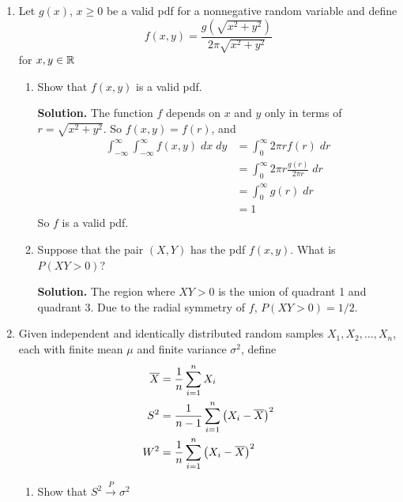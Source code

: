 \documentclass[titlepage]{article}
\begin{document}
\begin{enumerate}
\item Let $g(x)$, $x \geq 0$ be a valid pdf for a nonnegative random variable and define
\[ f(x, y) = \frac{ g(\sqrt{x^2 + y^2}) }{ 2\pi \sqrt{x^2 + y^2} }\]
for $x, y \in \mathbb{R}$
  \begin{enumerate}
  \item Show that $f(x, y)$ is a valid pdf.

  \textbf{Solution.} The function $f$ depends on $x$ and $y$ only in terms of  $r = \sqrt{x^2 + y^2}$. So $f(x, y) = f(r)$, and
  \[\begin{aligned}
  \int_{-\infty}^\infty \int_{-\infty}^\infty f(x, y) \; dx \; dy &= \int_0^\infty 2\pi r f(r)\; dr \\
  &= \int_0^\infty 2 \pi r \frac{g(r)}{2 \pi r} \; dr\\
  &= \int_0^\infty g(r) \; dr \\
  &= 1
  \end{aligned}\]
  So $f$ is a valid pdf.

  \item Suppose that the pair $(X, Y)$ has the pdf $f(x, y)$. What is $P(XY > 0)$?

  \textbf{Solution.} The region where $XY > 0$ is the union of quadrant 1 and quadrant 3. Due to the radial symmetry of $f$, $P(XY > 0) = 1/2$.
  \end{enumerate}

\item Given independent and identically distributed random samples $X_1, X_2, \ldots, X_n$, each with finite mean $\mu$ and finite variance $\sigma^2$, define
\[\begin{aligned}
\overline{X} &= \frac{1}{n} \sum_{i = 1}^n X_i \\
S^2 &= \frac{1}{n-1} \sum_{i = 1}^n \left(X_i - \overline{X}\right)^2 \\
W^2 &= \frac{1}{n} \sum_{i = 1}^n \left(X_i - \overline{X}\right)^2
\end{aligned}\]
  \begin{enumerate}
  \item Show that $S^2 \xrightarrow{P} \sigma^2$


\end{enumerate}
\end{enumerate}
\end{document}
